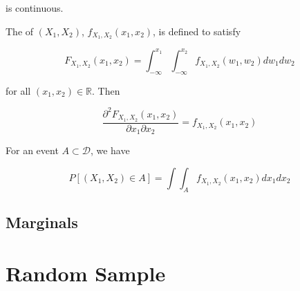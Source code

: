 \documentclass{article}
\begin{document}
            is continuous.

            The  of $ (X_{1}, X_{2})
            $, $ f_{X_{1}, X_{2}}(x_{1}, x_{2}) $, is defined to satisfy

            \begin{equation*}
                 F_{X_{1}, X_{2}} (x_{1}, x_{2}) = \int_{-\infty}^{x_{1}}
                     \int_{-\infty}^{x_{2}} f_{X_{1}, X_{2}} (w_{1}, w_{2}) d w_{1} d w_{2}
            \end{equation*}

            for all $ (x_{1}, x_{2}) \in \mathbb{R} $. Then

            \begin{equation*}
                 \frac{\partial^{2} F_{X_{1}, X_{2}} (x_{1}, x_{2})}{\partial
                     x_{1} \partial x_{2}} = f_{X_{1}, X_{2}} (x_{1}, x_{2})
            \end{equation*}

            For an event $ A \subset \mathcal{D} $, we have

            \begin{equation*}
                 P [ (X_{1}, X_{2}) \in A ] = \int \int_{A} f_{X_{1}, X_{2}}
                     (x_{1}, x_{2}) d x_{1} d x_{2}
            \end{equation*}

        \subsection*{Marginals}


    \section*{Random Sample}
\end{document}
